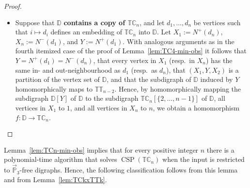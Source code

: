 \documentclass{article}
\theoremstyle{definition}
\theoremstyle{remark}
\DeclareMathOperator{\CSP}{CSP}
\newcommand{\bC}{{\mathbb C}}
\newcommand{\bD}{{\mathbb D}}
\newcommand{\bF}{{\mathbb F}}
\newcommand{\bP}{{\mathbb P}}
\newcommand{\bT}{{\mathbb T}}
\newcommand{\calF}{{\mathcal F}}
\begin{document}
\begin{proof}
{\begin{itemize}
        $d_{i+1}$ belongs to a directed $3$-cycle. Otherwise, $(v,d_{i+1})\in E(\bD)$, and since $\bD$ is
        $\calF_n$-free and $\bT_4^b\in\calF_n$ there is no edge $(u,d_{i+1})$ in $\bD$. This implies
        that either $d_{i+1} = u$ or $(d_{i+1},u)\in E(\bD)$ (because $\bD$ is $\vec{\bP}_3$-free), and
        in both cases $d_{i+1}$ belongs to a directed $3$-cycle. The case when $(d_{i+1},d_i)\in E(\bD)$ follows
        with symmetric arguments. We thus conclude by finite induction that there is some vertex $f_i \in F$
        that belongs to a directed $3$-cycle. With similar arguments as above, one can use such a directed $3$-cycle
        together with $\bF$ and the fact that
        $\bD$ is $\vec{\bP}_3$-free to find a tournament on $n$ vertices in $\bD$. This contradicts
        the assumption that $\bD$ is a $\calF_n$-free oriented graph that does not contain $\bT\bC_n$. 
        Finally, using the observation that $\bD$ is a $\vec{\bP}_3$-free acyclic digraph with no tournament on $n$ vertices
        we conclude that there is no homomorphism $f\colon \vec{\bP}_n\to \bD$. Hence, $\bD\to \bT\bT_{n-1}$
        (Observation~\ref{obs:P-TT}), and thus $\bD\to \bT\bC_n$.
        \item Suppose that $\bD$ \textbf{contains a copy of $\bT\bC_n$}, and let $d_1,\dots, d_n$ be vertices
        such that $i\mapsto d_i$ defines an embedding of $\bT\bC_n$ into $\bD$. Let $X_1:= N^+(d_n)$, $X_n:=N^-(d_1)$,
        and $Y := N^+(d_1)$. With analogous arguments as in the fourth itemized case of the proof of
        Lemma~\ref{lem:TC4-min-obs} it follows that $Y = N^+(d_1) = N^-(d_n)$, that every vertex in $X_1$ (resp.\ in $X_n$)
        has the same in- and out-neighbourhood as $d_1$ (resp.\ as $d_n$), that $(X_1,Y,X_2)$ is a partition
        of the vertex set of $\bD$, and that the subdigraph of $\bD$ induced by $Y$ homomorphically maps to
        $\bT\bT_{n-2}$. Hence, by homomorphically mapping the subdigraph $\bD[Y]$ of $\bD$ to the subdigraph
        $\bT\bC_n[\{2,\dots, n-1\}]$ of $\bD$, all vertices in $X_1$ to $1$, and all vertices in $X_n$ to $n$, 
        we obtain a homomorphism $f\colon \bD\to \bT\bC_n$. 
    \end{itemize}
    }
\end{proof}


Lemma~\ref{lem:TCn-min-obs}  implies that for every positive integer $n$ there is a polynomial-time
algorithm that solves $\CSP(\bT\bC_n)$ when the input is restricted to $\vec{\bP}_3$-free digraphs. 
Hence, the following classification follows from this lemma and from Lemma~\ref{lem:TCkxTTk}.
\end{document}
